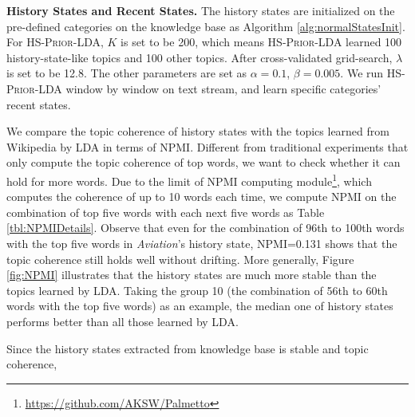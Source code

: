 \documentclass{article}
\begin{document}
\textbf{History States and Recent States.} 
The history states are initialized on the pre-defined categories on the knowledge base as Algorithm \ref{alg:normalStatesInit}.
For \textsc{HS-Prior-LDA}, \(K\) is set to be 200, which means \textsc{HS-Prior-LDA} learned 100 history-state-like topics and 100 other topics.
After cross-validated grid-search, \(\lambda\) is set to be 12.8. The other parameters are set as \(\alpha=0.1\), \(\beta=0.005\).
We run \textsc{HS-Prior-LDA} window by window on text stream, and learn specific categories' recent states.

We compare the topic coherence of history states with the topics learned from Wikipedia by LDA in terms of NPMI\cite{Rder2015ExploringTS}.
Different from traditional experiments that only compute the topic coherence of top words, we want to check whether  it can hold for more words.
Due to the limit of NPMI computing module\footnote{\url{https://github.com/AKSW/Palmetto}}, which computes the coherence of up to 10 words each time, we compute NPMI on the combination of top five words with each next five words as Table \ref{tbl:NPMIDetails}.
Observe that even for the combination of 96th to 100th words with the top five words in \textit{Aviation}'s history state, NPMI=0.131 shows that the topic coherence still holds well without drifting.
More generally, Figure \ref{fig:NPMI} illustrates that the history states are much more stable than the topics learned by LDA.
Taking the group 10 (the combination of 56th to 60th words with the top five words) as an example, the median one of history states performs better than all those learned by LDA. 

Since the history states extracted from knowledge base is stable and topic coherence, 



\end{document}

